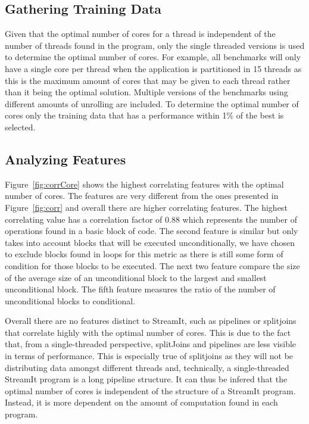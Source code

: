 \subsection{Gathering Training Data}
Given that the optimal number of cores for a thread is independent of the number of threads found in the program, only the single threaded versions is used to determine the optimal number of cores.
For example, all benchmarks will only have a single core per thread when the application is partitioned in 15 threads as this is the maximum amount of cores that may be given to each thread rather than it being the optimal solution. 
Multiple versions of the benchmarks using different amounts of unrolling are included.
To determine the optimal number of cores only the training data that has a performance within 1\% of the best is selected. 

\subsection{Analyzing Features}

Figure~\ref{fig:corrCore} shows the highest correlating features with the optimal number of cores.
The features are very different from the ones presented in Figure~\ref{fig:corr} and overall there are higher correlating features.
The highest correlating value has a correlation factor of 0.88 which represents the number of operations found in a basic block of code.
The second feature is similar but only takes into account blocks that will be executed unconditionally, we have chosen to exclude blocks found in loops for this metric as there is still some form of condition for those blocks to be executed.
The next two feature compare the size of the average size of an unconditional block to the largest and smallest unconditional block.
The fifth feature measures the ratio of the number of unconditional blocks to conditional.

Overall there are no features distinct to StreamIt, such as pipelines or splitjoins that correlate highly with the optimal number of cores.
This is due to the fact that, from a single-threaded perspective, splitJoins and pipelines are less visible in terms of performance.
This is especially true of splitjoins as they will not be distributing data amongst different threads and, technically, a single-threaded StreamIt program is a long pipeline structure.
It can thus be infered that the optimal number of cores is independent of the structure of a StreamIt program.
Instead, it is more dependent on the amount of computation found in each program.

